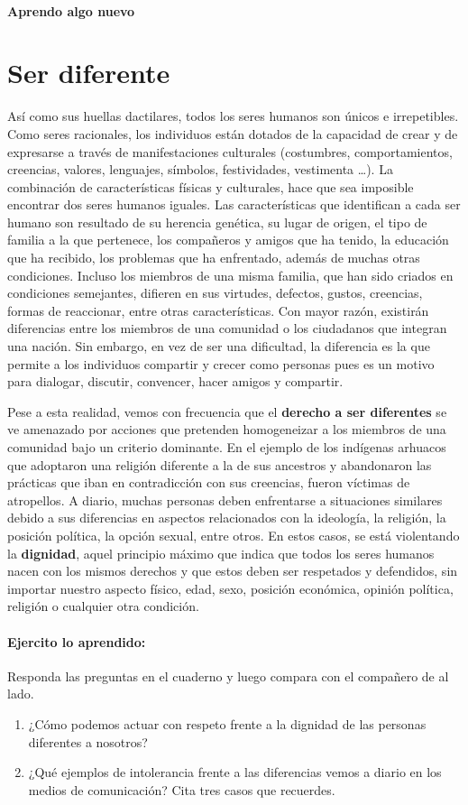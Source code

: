 \documentclass[10pt,twoside]{article}
\begin{document}
\paragraph*{Aprendo algo nuevo}
\section*{Ser diferente}
Así como sus huellas dactilares, todos los seres humanos son únicos e irrepetibles. Como seres racionales, los individuos están dotados de la capacidad de crear y de expresarse a través de manifestaciones culturales (costumbres, comportamientos, creencias, valores, lenguajes, símbolos, festividades, vestimenta \ldots). La combinación de características físicas y culturales, hace que sea imposible encontrar dos seres humanos iguales. Las características que identifican a cada ser humano son resultado de su herencia genética, su lugar de origen, el
tipo de familia a la que pertenece, los compañeros y amigos que ha tenido, la educación que ha recibido, los problemas que ha enfrentado, además de muchas otras condiciones. Incluso los miembros de una misma familia, que han sido criados en condiciones semejantes, difieren en sus virtudes, defectos, gustos, creencias, formas de reaccionar, entre
otras características. Con mayor razón, existirán diferencias entre los miembros de una comunidad o los ciudadanos que integran una nación. Sin embargo, en vez de ser una dificultad, la diferencia es la que permite a los individuos compartir y crecer como personas pues es un motivo para
dialogar, discutir, convencer, hacer amigos y compartir.

Pese a esta realidad, vemos con frecuencia que el \textbf{derecho a ser diferentes} se ve amenazado por acciones que pretenden homogeneizar a los miembros de una comunidad bajo un criterio dominante. En el ejemplo de los indígenas arhuacos que adoptaron una religión diferente a la de sus ancestros y abandonaron las prácticas que iban en contradicción con sus creencias, fueron víctimas de atropellos. A diario, muchas personas deben enfrentarse a situaciones similares debido a sus diferencias en
aspectos relacionados con la ideología, la religión, la posición
política, la opción sexual, entre otros. En estos casos, se está
violentando la \textbf{dignidad}, aquel principio máximo que indica que todos los seres humanos nacen con los mismos derechos y que estos deben ser respetados y defendidos, sin importar nuestro aspecto físico, edad, sexo, posición económica, opinión política, religión o cualquier otra condición.
\paragraph*{Ejercito lo aprendido:} 
Responda las preguntas en el cuaderno y luego compara con el compañero de al lado.
\begin{enumerate}
\item ¿Cómo podemos actuar con respeto frente a la dignidad de
las personas diferentes a nosotros?
\item ¿Qué ejemplos de intolerancia frente a las diferencias vemos a diario en los medios de comunicación? Cita tres casos que recuerdes.
\end{enumerate}
\end{document}
